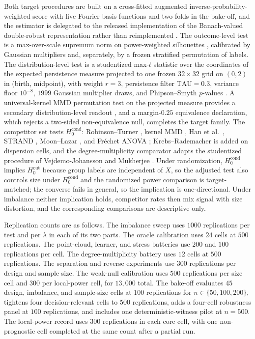 Both target procedures are built on a cross-fitted augmented inverse-probability-weighted score with five Fourier basis functions and two folds in the bake-off, and the estimator is delegated to the released implementation of the Banach-valued double-robust representation rather than reimplemented \cite{chernozhukov_dml_2018,souto_diamantis_tcda_2026}. The outcome-level test is a max-over-scale supremum norm on power-weighted silhouettes \cite{bubenik_jmlr_2015,chazal_socg_2014}, calibrated by Gaussian multipliers and, separately, by a frozen stratified permutation of labels. The distribution-level test is a studentized max-$t$ statistic over the coordinates of the expected persistence measure \cite{divol_chazal_2020} projected to one frozen $32\times 32$ grid on $(0,2)$ in (birth, midpoint), with weight $r=3$, persistence filter $\mathrm{TAU}=0.3$, variance floor $10^{-8}$, $1999$ Gaussian multiplier draws, and Phipson--Smyth $p$-values \cite{cck_2013,phipson_smyth_2010}. A universal-kernel MMD permutation test on the projected measure provides a secondary distribution-level readout \cite{kwitt_neurips_2015,gretton_2012}, and a margin-$0.25$ equivalence declaration, which rejects a two-sided non-equivalence null, completes the target family.
The competitor set tests $H_0^{\mathrm{cond}}$: Robinson--Turner \cite{robinson_turner_2017}, kernel MMD \cite{gretton_2012}, Han et al.\ \cite{han_kim_kim_2026}, STRAND \cite{murris_strand_2026}, Moon--Lazar \cite{moon_lazar_2023}, and Fr\'echet ANOVA \cite{dubey_muller_2019}; Krebs--Rademacher \cite{krebs_rademacher_2024} is added on dispersion cells, and the degree-multiplicity comparator adapts the studentized procedure of Vejdemo-Johansson and Mukherjee \cite{vejdemo_mukherjee_2022}. Under randomization, $H_0^{\mathrm{cond}}$ implies $H_0^{\mathrm{out}}$ because group labels are independent of $X$, so the adjusted test also controls size under $H_0^{\mathrm{cond}}$ and the randomized power comparison is target-matched; the converse fails in general, so the implication is one-directional. Under imbalance neither implication holds, competitor rates then mix signal with size distortion, and the corresponding comparisons are descriptive only.

Replication counts are as follows. The imbalance sweep uses $1000$ replications per test and per $\lambda$ in each of its two parts. The oracle calibration uses $24$ cells at $500$ replications. The point-cloud, learner, and stress batteries use $200$ and $100$ replications per cell. The degree-multiplicity battery uses $12$ cells at $500$ replications. The separation and reverse experiments use $300$ replications per design and sample size. The weak-null calibration uses $500$ replications per size cell and $300$ per local-power cell, for $13{,}000$ total. The bake-off evaluates $45$ design, imbalance, and sample-size cells at $100$ replications for $n \in \{50,100,200\}$, tightens four decision-relevant cells to $500$ replications, adds a four-cell robustness panel at $100$ replications, and includes one deterministic-witness pilot at $n=500$. The local-power record uses $300$ replications in each core cell, with one non-prognostic cell completed at the same count after a partial run.
